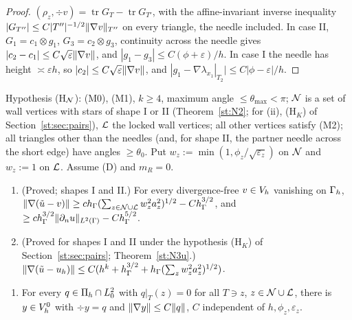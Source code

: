 \begin{proof}
$(\rho_z,\div v)=\operatorname{tr}G_T-\operatorname{tr}G_{T'}$, with the affine-invariant inverse inequality $|G_{T''}|\le C|T''|^{-1/2}\lVert \nabla v\rVert_{T''}$ on every triangle, the needle included. In case II, $G_1=c_1\otimes g_1$, $G_3=c_2\otimes g_3$, continuity across the needle gives $|c_2-c_1|\le C\sqrt\varepsilon\lVert \nabla v\rVert$, and $|g_1-g_3|\le C(\phi+\varepsilon)/h$. In case I the needle has height $\asymp\varepsilon h$, so $|c_2|\le C\sqrt\varepsilon\lVert \nabla v\rVert$, and $|g_1-\nabla\lambda_{x_1}|_{T_2}|\le C|\phi-\varepsilon|/h$.
\end{proof}

\begin{theorem}\label{st:N3}
Hypothesis (H$_\Nset$): (M0), (M1), $k\ge4$, maximum angle $\le\theta_{\max}<\pi$; $\mathcal N$ is a set of wall vertices with stars of shape I or II (Theorem~\ref{st:N2}; for (ii), (H$_K$) of Section~\ref{st:sec:pairs}), $\mathcal L$ the locked wall vertices; all other vertices satisfy (M2); all triangles other than the needles (and, for shape II, the partner needle across the short edge) have angles $\ge\theta_0$. Put $w_z:=\min(1,\phi_z/\sqrt{\varepsilon_z})$ on $\mathcal N$ and $w_z:=1$ on $\mathcal L$. Assume (D) and $m_R=0$.
\begin{enumerate}[label=(\roman*)]
\item (Proved; shapes I and II.) For every divergence-free $v\in V_h$ vanishing on $\Gamma_h$,
$\lVert \nabla(\tilde u-v)\rVert\ge ch_\Gamma(\sum_{z\in\mathcal N\cup\mathcal L}w_z^2a_z^2)^{1/2}-Ch_\Gamma^{3/2}$, and $\ge ch_\Gamma^{3/2}\lVert \partial_n u\rVert_{L^2(\Gamma)}-Ch_\Gamma^{5/2}$.
\item (Proved for shapes I and II under the hypothesis (H$_K$) of Section~\ref{st:sec:pairs}; Theorem~\ref{st:N3u}.) $\lVert \nabla(\tilde u-u_h)\rVert\le C(h^k+h_\Gamma^{3/2}+h_\Gamma(\sum_zw_z^2a_z^2)^{1/2})$.
\end{enumerate}
\begin{enumerate}
\item[(L$_\Nset$)] For every $q\in\Pi_h\cap L^2_0$ with $q|_T(z)=0$ for all $T\ni z$, $z\in\mathcal N\cup\mathcal L$, there is $y\in V_h^0$ with $\div y=q$ and $\lVert \nabla y\rVert\le C\lVert q\rVert$, $C$ independent of $h,\phi_z,\varepsilon_z$.
\end{enumerate}
\end{theorem}

